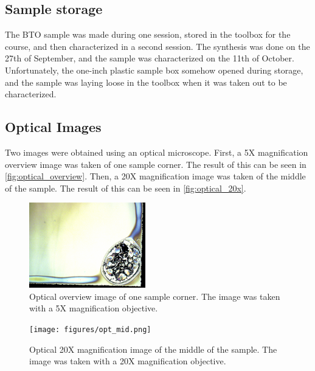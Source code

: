 \subsection{Sample storage}
\label{sec:sample-storage}
\noindent The BTO sample was made during one session, stored in the toolbox for the course, and then characterized in a second session.
The synthesis was done on the 27th of September, and the sample was characterized on the 11th of October.
Unfortunately, the one-inch plastic sample box somehow opened during storage, and the sample was laying loose in the toolbox when it was taken out to be characterized.




\subsection{Optical Images}

\noindent Two images were obtained using an optical microscope.
First, a 5X magnification overview image was taken of one sample corner.
The result of this can be seen in \autoref{fig:optical_overview}.
Then, a 20X magnification image was taken of the middle of the sample.
The result of this can be seen in \autoref{fig:optical_20x}.

\begin{figure}[ht]
    \centering
    \includegraphics[width=0.45\textwidth]{figures/opt_corner.png}
    \caption{
        Optical overview image of one sample corner.
        The image was taken with a 5X magnification objective.
    }
    \label{fig:optical_overview}
\end{figure}

\begin{figure}[ht]
    \centering
    \texttt{[image: figures/opt\_mid.png]}
    \caption{
        Optical 20X magnification image of the middle of the sample.
        The image was taken with a 20X magnification objective.
    }
    \label{fig:optical_20x}
\end{figure}



